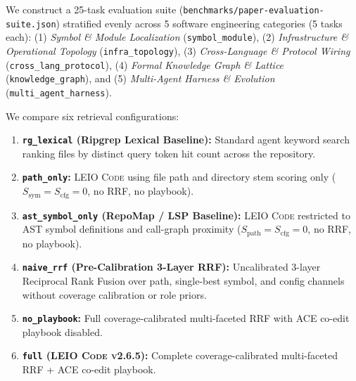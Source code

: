 \documentclass[11pt]{article}
\begin{document}
We construct a 25-task evaluation suite (\texttt{benchmarks/paper-evaluation-suite.json}) stratified evenly across 5 software engineering categories (5 tasks each):
(1) \emph{Symbol \& Module Localization} (\texttt{symbol\_module}),
(2) \emph{Infrastructure \& Operational Topology} (\texttt{infra\_topology}),
(3) \emph{Cross-Language \& Protocol Wiring} (\texttt{cross\_lang\_protocol}),
(4) \emph{Formal Knowledge Graph \& Lattice} (\texttt{knowledge\_graph}), and
(5) \emph{Multi-Agent Harness \& Evolution} (\texttt{multi\_agent\_harness}).

We compare six retrieval configurations:
\begin{enumerate}
    \item \textbf{\texttt{rg\_lexical} (Ripgrep Lexical Baseline):} Standard agent keyword search ranking files by distinct query token hit count across the repository.
    \item \textbf{\texttt{path\_only}:} \textsc{LEIO Code} using file path and directory stem scoring only ($S_{\text{sym}} = S_{\text{cfg}} = 0$, no RRF, no playbook).
    \item \textbf{\texttt{ast\_symbol\_only} (RepoMap / LSP Baseline):} \textsc{LEIO Code} restricted to AST symbol definitions and call-graph proximity ($S_{\text{path}} = S_{\text{cfg}} = 0$, no RRF, no playbook).
    \item \textbf{\texttt{naive\_rrf} (Pre-Calibration 3-Layer RRF):} Uncalibrated 3-layer Reciprocal Rank Fusion over path, single-best symbol, and config channels without coverage calibration or role priors.
    \item \textbf{\texttt{no\_playbook}:} Full coverage-calibrated multi-faceted RRF with ACE co-edit playbook disabled.
    \item \textbf{\texttt{full} (\textsc{LEIO Code v2.6.5}):} Complete coverage-calibrated multi-faceted RRF + ACE co-edit playbook.
\end{enumerate}
\end{document}
